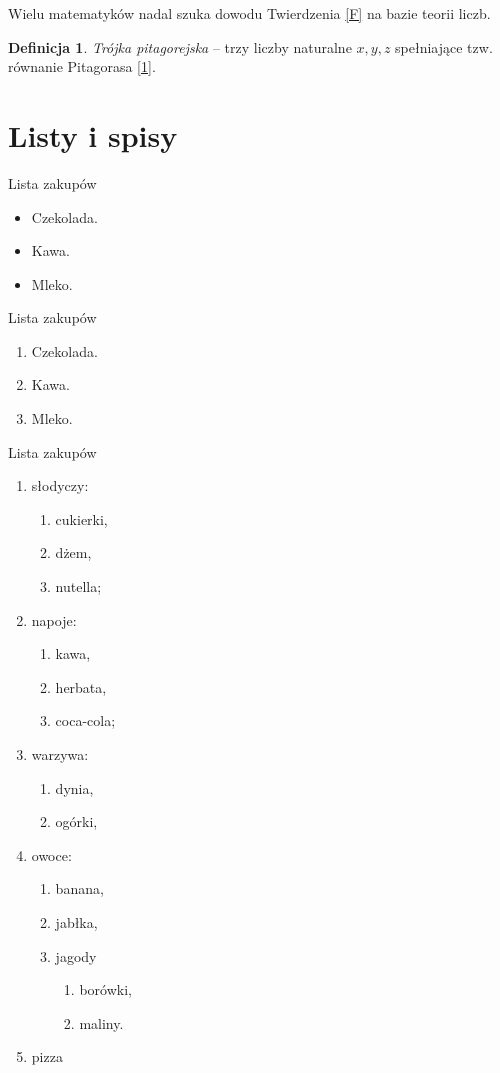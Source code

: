 \documentclass[a4paper, 12pt, reqno]{amsart}
\theoremstyle{definition}
\newtheorem*{definition}{Definicja}
\begin{document}
  

Wielu matematyków nadal szuka dowodu Twierdzenia \ref{F} na bazie teorii liczb.

\begin{definition}
\textit{Trójka pitagorejska} -- trzy liczby naturalne $x,y,z$ spełniające tzw. równanie Pitagorasa \eqref{1}.
\end{definition}

\section{Listy i spisy}
Lista zakupów
\begin{itemize}[label=$\heartsuit$]
  \item Czekolada.
  \item Kawa.
  \item Mleko.
\end{itemize}

Lista zakupów
\begin{enumerate}
  \item Czekolada.
  \item Kawa.
  \item Mleko.
\end{enumerate}

Lista zakupów
\begin{enumerate}
  \item słodyczy:
		\begin{enumerate}
		  \item cukierki,
		  \item dżem,
		  \item nutella;
		\end{enumerate}
  \item napoje:
		\begin{enumerate}
		  \item kawa,
		  \item herbata,
		  \item coca-cola;
		\end{enumerate}
  \item warzywa:
		\begin{enumerate}
		  \item dynia,
		  \item ogórki,
		\end{enumerate}
 \item owoce:
		\begin{enumerate}
		  \item banana,
		  \item jabłka,
  		\item jagody
		          \begin{enumerate}
				  \item borówki,
				  \item maliny.
				\end{enumerate}
		\end{enumerate}
\item pizza
\end{enumerate}
\end{document}
